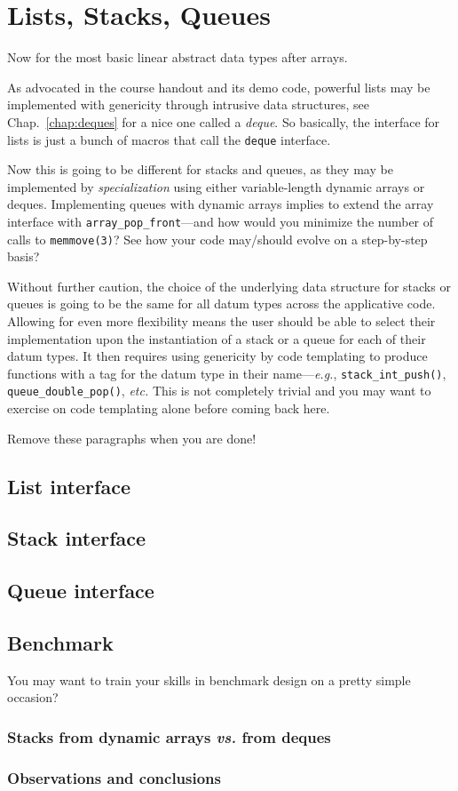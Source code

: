 \chapter{Lists, Stacks, Queues}\label{chap:linear}

Now for the most basic linear abstract data types after arrays. 

As advocated in the course handout and its demo code, powerful lists may be implemented with genericity through intrusive data structures, see Chap.~\ref{chap:deques} for a nice one called a \textit{deque}. So basically, the interface for lists is just a bunch of macros that call the \texttt{deque} interface. 

Now this is going to be different for stacks and queues, as they may be implemented by \textit{specialization} using either variable-length dynamic arrays or deques. Implementing queues with dynamic arrays implies to extend the array interface with \texttt{array\_pop\_front}---and how would you minimize the number of calls to \texttt{memmove(3)}? See how your code may/should evolve on a step-by-step basis?

Without further caution, the choice of the underlying data structure for stacks or queues is going to be the same for all datum types across the applicative code. Allowing for even more flexibility means the user should be able to select their implementation upon the instantiation of a stack or a queue for each of their datum types. It then requires using genericity by code templating to produce functions with a tag for the datum type in their name---\textit{e.g.}, \texttt{stack\_int\_push()}, \texttt{queue\_double\_pop()}, \textit{etc.} This is not completely trivial and you may want to exercise on code templating alone before coming back here. 

Remove these paragraphs when you are done!

\section{List interface}\label{lists:interface}

\section{Stack interface}\label{stacks:interface}

\section{Queue interface}\label{queues:interface}


\section{Benchmark}

You may want to train your skills in benchmark design on a pretty simple occasion?

\subsection{Stacks from dynamic arrays \textit{vs.} from deques}

\subsection{Observations and conclusions}

